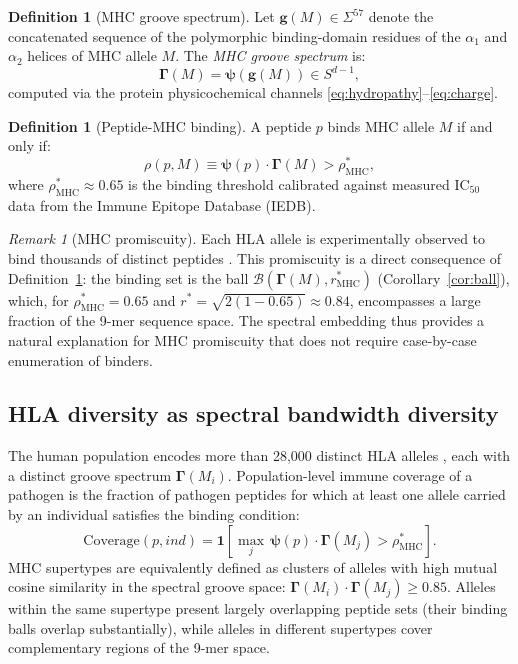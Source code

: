 \documentclass[twocolumn,11pt,a4paper]{article}
\theoremstyle{definition}
\newtheorem{definition}[theorem]{Definition}
\theoremstyle{remark}
\newtheorem{remark}[theorem]{Remark}
\begin{document}
\begin{definition}[MHC groove spectrum]
\label{def:mhc_spectrum}
Let $\mathbf{g}(M) \in \Sigma^{57}$ denote the concatenated sequence of the
polymorphic binding-domain residues of the $\alpha_1$ and $\alpha_2$ helices
of MHC allele $M$. The \emph{MHC groove spectrum} is:
\begin{equation}
  \bm{\Gamma}(M) = \bm{\psi}(\mathbf{g}(M)) \in S^{d-1},
  \label{eq:mhc_spectrum}
\end{equation}
computed via the protein physicochemical channels
\eqref{eq:hydropathy}--\eqref{eq:charge}.
\end{definition}

\begin{definition}[Peptide-MHC binding]
\label{def:pmhc_binding}
A peptide $p$ binds MHC allele $M$ if and only if:
\begin{equation}
  \rho(p, M) \equiv \bm{\psi}(p)\cdot\bm{\Gamma}(M) > \rho^*_{\mathrm{MHC}},
  \label{eq:pmhc_binding}
\end{equation}
where $\rho^*_{\mathrm{MHC}} \approx 0.65$ is the binding threshold calibrated
against measured $\mathrm{IC}_{50}$ data from the Immune Epitope Database
(IEDB).
\end{definition}

\begin{remark}[MHC promiscuity]
Each HLA allele is experimentally observed to bind thousands of distinct
peptides \citep{sette1999,neefjes2011}. This promiscuity is a direct
consequence of Definition~\ref{def:pmhc_binding}: the binding set is the
ball $\mathcal{B}(\bm{\Gamma}(M), r^*_{\mathrm{MHC}})$
(Corollary~\ref{cor:ball}), which, for $\rho^*_{\mathrm{MHC}} = 0.65$ and
$r^* = \sqrt{2(1-0.65)} \approx 0.84$, encompasses a large fraction of the
9-mer sequence space. The spectral embedding thus provides a natural explanation
for MHC promiscuity that does not require case-by-case enumeration of binders.
\end{remark}

\subsection{HLA diversity as spectral bandwidth diversity}
\label{sec:hla_diversity}

The human population encodes more than 28,000 distinct HLA alleles
\citep{robinson2015}, each with a distinct groove spectrum $\bm{\Gamma}(M_i)$.
Population-level immune coverage of a pathogen is the fraction of pathogen
peptides for which at least one allele carried by an individual satisfies the
binding condition:
\begin{equation}
  \mathrm{Coverage}(p, \mathit{ind}) = \mathbf{1}\!\left[
    \max_{j}\, \bm{\psi}(p)\cdot\bm{\Gamma}(M_j) > \rho^*_{\mathrm{MHC}}
  \right].
  \label{eq:coverage}
\end{equation}
MHC supertypes \citep{sette1999} are equivalently defined as clusters of
alleles with high mutual cosine similarity in the spectral groove space:
$\bm{\Gamma}(M_i)\cdot\bm{\Gamma}(M_j) \geq 0.85$. Alleles within the same
supertype present largely overlapping peptide sets (their binding balls overlap
substantially), while alleles in different supertypes cover complementary
regions of the 9-mer space.
\end{document}
